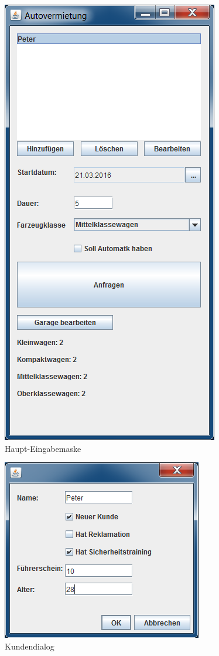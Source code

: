 \begin{figure}
\centering
\includegraphics[width=0.7\linewidth]{Bilder/Screenshots/Autovermietung}
\caption{Haupt-Eingabemaske }
\label{fig:Autovermietung}
\end{figure}


\begin{figure}
\centering
\includegraphics[width=0.7\linewidth]{Bilder/Screenshots/kunde}
\caption{Kundendialog}
\label{fig:kunde}
\end{figure}


